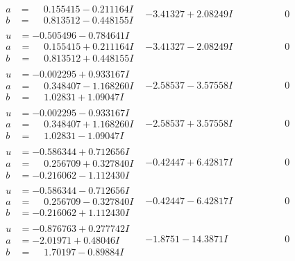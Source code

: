 \documentclass[1p]{elsarticle_modified}
\theoremstyle{definition}
\begin{document}
$$\begin{array}{c|c|c}
\begin{aligned}
a &= \phantom{-}0.155415 - 0.211164 I \\
b &= \phantom{-}0.813512 - 0.448155 I\end{aligned}
 & -3.41327 + 2.08249 I & \phantom{-0.000000 } 0 \\ \hline\begin{aligned}
u &= -0.505496 - 0.784641 I \\
a &= \phantom{-}0.155415 + 0.211164 I \\
b &= \phantom{-}0.813512 + 0.448155 I\end{aligned}
 & -3.41327 - 2.08249 I & \phantom{-0.000000 } 0 \\ \hline\begin{aligned}
u &= -0.002295 + 0.933167 I \\
a &= \phantom{-}0.348407 - 1.168260 I \\
b &= \phantom{-}1.02831 + 1.09047 I\end{aligned}
 & -2.58537 - 3.57558 I & \phantom{-0.000000 } 0 \\ \hline\begin{aligned}
u &= -0.002295 - 0.933167 I \\
a &= \phantom{-}0.348407 + 1.168260 I \\
b &= \phantom{-}1.02831 - 1.09047 I\end{aligned}
 & -2.58537 + 3.57558 I & \phantom{-0.000000 } 0 \\ \hline\begin{aligned}
u &= -0.586344 + 0.712656 I \\
a &= \phantom{-}0.256709 + 0.327840 I \\
b &= -0.216062 - 1.112430 I\end{aligned}
 & -0.42447 + 6.42817 I & \phantom{-0.000000 } 0 \\ \hline\begin{aligned}
u &= -0.586344 - 0.712656 I \\
a &= \phantom{-}0.256709 - 0.327840 I \\
b &= -0.216062 + 1.112430 I\end{aligned}
 & -0.42447 - 6.42817 I & \phantom{-0.000000 } 0 \\ \hline\begin{aligned}
u &= -0.876763 + 0.277742 I \\
a &= -2.01971 + 0.48046 I \\
b &= \phantom{-}1.70197 - 0.89884 I\end{aligned}
 & -1.8751 - 14.3871 I & \phantom{-0.000000 } 0 \\ \hline\begin{aligned}

\end{aligned}
\end{array}$$
\end{document}
